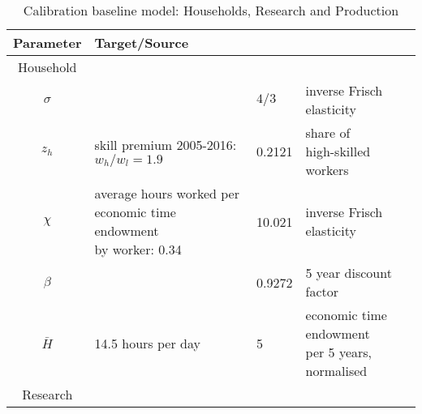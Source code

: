 \pagebreak
\thispagestyle{empty}
	\begin{table}[h!]
		\begin{center}
			\captionsetup{width=0.9\textwidth}
			\caption{ Calibration baseline model: Households, Research and Production}
			\label{tab:calib}
			\begin{tabular}{c|lll}
				\hline \hline
				Parameter& Target/Source& \makecell[l]{Calibration}& \makecell[l]{Meaning}\\ 
				\hline
				\hline
				Household&\multicolumn{3}{c}{}\\
				\hline 
				
				\hline
				$\sigma$ &  \makecell[l]{\cite{Chetty2011AreMargins}}& $4/3$ & inverse Frisch elasticity  \\
				\hline
				$z_h$& \makecell[l]{skill premium 2005-2016:\\ $w_h/w_l=1.9$\\ \citep{Slavik2020WagePremium}}&0.2121&\makecell[l]{share of\\ high-skilled workers} \\	
				\hline			
				$\chi$ &  \makecell[l]{average hours worked per\\ economic time endowment\\ by worker: 0.34 \cite{OECDHoursworked}}& 10.021 & inverse Frisch elasticity  \\
				\hline
				$\beta$ &  \makecell[l]{\cite{Barrage2019OptimalPolicy}}& 0.9272 & 5 year discount factor  \\
				\hline
				$\bar{H}$& \makecell[l]{14.5 hours per day\\ \cite{Jones1993OptimalGrowth}}&5&\makecell[l]{economic time endowment \\per 5 years, normalised} \\
				\hline
				\hline
				Research&\multicolumn{3}{c}{}\\
				\hline
				

\end{tabular}
\end{center}
\end{table}
